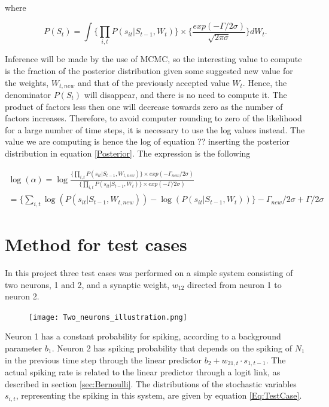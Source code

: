 where

\begin{equation}
        P(S_t) = \int \Big\{\prod_{i,t} P(s_{it}|S_{t-1}, W_t)\Big\} \times \Big\{\frac{exp(-\Gamma /2\sigma)}{\sqrt{2\pi \sigma}}\Big\} d{W_t}.
\end{equation}

Inference will be made by the use of MCMC, so the interesting value to compute is the fraction of the posterior distribution given some suggested new value for the weights, $W_{t, new}$ and that of the previously accepted value $W_t$. Hence, the denominator $P(S_t)$ will disappear, and there is no need to compute it. The product of factors less then one will decrease towards zero as the number of factors increases. Therefore, to avoid computer rounding to zero of the likelihood for a large number of time steps, it is necessary to use the log values instead. The value we are computing is hence the log of equation ??  inserting the posterior distribution in equation \ref{Posterior}. The expression is the following

\begin{equation}
\label{eq:ratio}
\begin{split}
    \log (\alpha) = 
    \log \frac{\big \{ \prod_{i,t} P(s_{it}|S_{t-1}, W_{t,new})\big \} \times exp(-\Gamma_{new} /2\sigma)}{\big \{ \prod_{i,t}  P(s_{it}|S_{t-1}, W_t) \big \} \times exp(-\Gamma /2\sigma)} \\
    = \Big \{ \sum_{i,t} \log( P(s_{it}|S_{t-1}, W_{t,new})) - \log( P(s_{it}|S_{t-1}, W_t)) \Big \} -\Gamma_{new} /2\sigma +  \Gamma /2\sigma
\end{split}
\end{equation}


\section{Method for test cases}
\label{Method}

In this project three test cases was performed on a simple system consisting of two neurons, 1 and 2, and a synaptic weight, $w_{12}$ directed from neuron 1 to neuron 2.

\begin{figure}[h]
    \centering
    \texttt{[image: Two\_neurons\_illustration.png]}
\end{figure}

Neuron 1 has a constant probability for spiking, according to a background parameter $b_1$. Neuron 2 has spiking probability that depends on the spiking of $N_1$ in the previous time step through the linear predictor $b_2 + w_{21,t} \cdot s_{1,t-1}$. The actual spiking rate is related to the linear predictor through a logit link, as described in section \ref{sec:Bernoulli}. The distributions of the stochastic variables $s_{i,t}$, representing the spiking in this system, are given by equation \ref{Eq:TestCase}.

